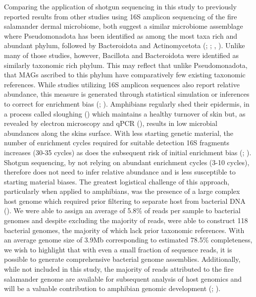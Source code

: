 \documentclass[
  12pt,
]{article}
\begin{document}
Comparing the application of shotgun sequencing in this study to
previously reported results from other studies using 16S amplicon
sequencing of the fire salamander dermal microbiome, both suggest a
similar microbiome assemblage where Pseudomonadota has been identified
as among the most taxa rich and abundant phylum, followed by
Bacteroidota and Actinomycetota
(;
;
,
). Unlike many of those
studies, however, Bacillota and Bacteroidota were identified as
similarly taxonomic rich phylum. This may reflect that unlike
Pseudomonadota, that MAGs ascribed to this phylum have comparatively few
existing taxonomic references. While studies utilizing 16S amplicon
sequences also report relative abundance, this measure is generated
through statistical simulation or inferences to correct for enrichment
bias (;
). Amphibians
regularly shed their epidermis, in a process called sloughing
() which maintains a
healthy turnover of skin but, as revealed by electron microscopy and
qPCR (),
results in low microbial abundances along the skins surface. With less
starting genetic material, the number of enrichment cycles required for
suitable detection 16S fragments increases (30-35 cycles) as does the
subsequent risk of initial enrichment bias
(;
). Shotgun
sequencing, by not relying on abundant enrichment cycles (3-10 cycles),
therefore does not need to infer relative abundance and is less
susceptible to starting material biases. The greatest logistical
challenge of this approach, particularly when applied to amphibians, was
the presence of a large complex host genome which required prior
filtering to separate host from bacterial DNA
(). We
were able to assign an average of 5.8\% of reads per sample to bacterial
genomes and despite excluding the majority of reads, were able to
construct 118 bacterial genomes, the majority of which lack prior
taxonomic references. With an average genome size of 3.9Mb corresponding
to estimated 78.5\% completeness, we wish to highlight that with even a
small fraction of sequence reads, it is possible to generate
comprehensive bacterial genome assemblies. Additionally, while not
included in this study, the majority of reads attributed to the fire
salamander genome are available for subsequent analysis of host genomics
and will be a valuable contribution to amphibian genomic development
(;
).
\end{document}
